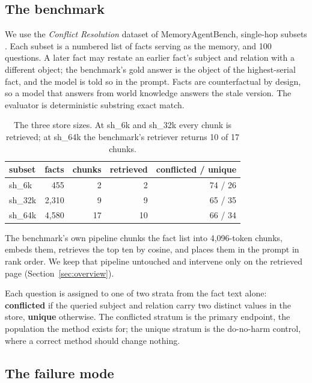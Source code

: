 \documentclass[journal=jcisd8,manuscript=article]{achemso}
\begin{document}
\subsection{The benchmark}

We use the \emph{Conflict Resolution} dataset of MemoryAgentBench, single-hop subsets . Each subset is a numbered list of facts serving as the memory, and 100 questions. A later fact may restate an earlier fact's subject and relation with a different object; the benchmark's gold answer is the object of the highest-serial fact, and the model is told so in the prompt. Facts are counterfactual by design, so a model that answers from world knowledge answers the stale version. The evaluator is deterministic substring exact match.

\begin{table}[H]\centering
\caption{The three store sizes. At sh\_6k and sh\_32k every chunk is retrieved; at sh\_64k the benchmark's retriever returns 10 of 17 chunks.}
\begin{tabular}{lrrrr}\toprule
subset & facts & chunks & retrieved & conflicted / unique \\\midrule
sh\_6k & 455 & 2 & 2 & 74 / 26\\
sh\_32k & 2,310 & 9 & 9 & 65 / 35\\
sh\_64k & 4,580 & 17 & 10 & 66 / 34\\\bottomrule
\end{tabular}\label{tab:stores}\end{table}

The benchmark's own pipeline chunks the fact list into 4,096-token chunks, embeds them, retrieves the top ten by cosine, and places them in the prompt in rank order. We keep that pipeline untouched and intervene only on the retrieved page (Section~\ref{sec:overview}).

Each question is assigned to one of two strata from the fact text alone: \textbf{conflicted} if the queried subject and relation carry two distinct values in the store, \textbf{unique} otherwise. The conflicted stratum is the primary endpoint, the population the method exists for; the unique stratum is the do-no-harm control, where a correct method should change nothing.

\subsection{The failure mode}
\label{sec:failure}
\end{document}
